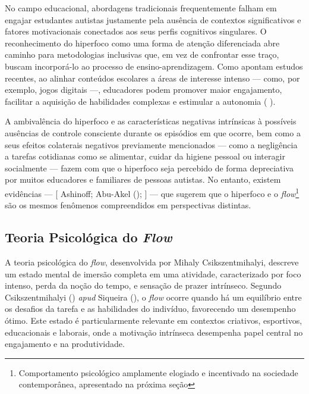 \documentclass[
  12pt,
  a4paper,
]{article}
\begin{document}
No campo educacional, abordagens tradicionais frequentemente falham em
engajar estudantes autistas justamente pela ausência de contextos
significativos e fatores motivacionais conectados aos seus perfis
cognitivos singulares. O reconhecimento do hiperfoco como uma forma de
atenção diferenciada abre caminho para metodologias inclusivas que, em
vez de confrontar esse traço, buscam incorporá-lo ao processo de
ensino-aprendizagem. Como apontam estudos recentes, ao alinhar conteúdos
escolares a áreas de interesse intenso --- como, por exemplo, jogos
digitais ---, educadores podem promover maior engajamento, facilitar a
aquisição de habilidades complexas e estimular a autonomia
(
).

A ambivalência do hiperfoco e as características negativas intrínsicas à
possíveis ausências de controle consciente durante os episódios em que
ocorre, bem como a seus efeitos colaterais negativos previamente
mencionados --- como a negligência a tarefas cotidianas como se
alimentar, cuidar da higiene pessoal ou interagir socialmente --- fazem
com que o hiperfoco seja percebido de forma depreciativa por muitos
educadores e familiares de pessoas autistas. No entanto, existem
evidências --- {[} Ashinoff; Abu-Akel
(); {]} --- que sugerem que o hiperfoco
e o \emph{flow}\footnote{Comportamento psicológico amplamente elogiado e
  incentivado na sociedade contemporânea, apresentado na próxima seção}
são os mesmos fenômenos compreendidos em perspectivas distintas.

\subsection{\texorpdfstring{Teoria Psicológica do
\emph{Flow}}{Teoria Psicológica do Flow}}\label{teoria-psicoluxf3gica-do-flow}

A teoria psicológica do \emph{flow}, desenvolvida por Mihaly
Csikszentmihalyi, descreve um estado mental de imersão completa em uma
atividade, caracterizado por foco intenso, perda da noção do tempo, e
sensação de prazer intrínseco. Segundo Csikszentmihalyi
() \emph{apud} Siqueira
(), o \emph{flow} ocorre quando há um
equilíbrio entre os desafios da tarefa e as habilidades do indivíduo,
favorecendo um desempenho ótimo. Este estado é particularmente relevante
em contextos criativos, esportivos, educacionais e laborais, onde a
motivação intrínseca desempenha papel central no engajamento e na
produtividade.
\end{document}
